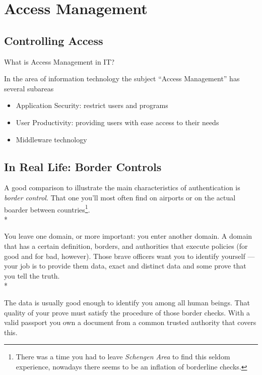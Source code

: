 
\chapter{Access Management}

\section{Controlling Access}

What is Access Management in IT\@?

In the area of information technology the subject ``Access Management'' 
has several subareas

\begin{itemize}
    \item Application Security: restrict users and programs
    \item User Productivity: providing users with ease access to their needs
    \item Middleware technology
\end{itemize}



\section{In Real Life: Border Controls}

A good comparison to illustrate the main characteristics of
authentication is \emph{border control}. That one you'll most often find
on airports or on the actual boarder between countries\footnote{There
was a time you had to leave \emph{Schengen Area} to find this seldom
experience, nowadays there seems to be an inflation of borderline
checks.}.\\*

You leave one domain, or more important: you enter another domain. 
A domain that has a certain definition, borders, and authorities that 
execute policies (for good and for bad, however).  Those brave officers 
want you to identify yourself --- your job is to provide them data, exact 
and distinct data and some prove that you tell the truth.\\*

The data is usually good enough to identify you among all human beings.
That quality of your prove must satisfy the procedure of those border
checks. With a valid passport you own a document from a common trusted
authority that covers this.

